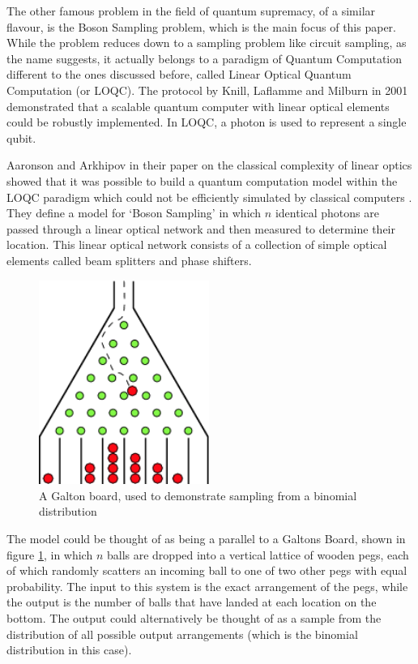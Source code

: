 \documentclass[ %
                    author={Manan Vaswani},
                supervisor={Dr. Raphael Clifford},
                    degree={MEng},
                     title={A multi-core CPU implementation \n of the classical Boson Sampling algorithm},
                  subtitle={},
                      type={},
                      year={2019} ]{dissertation}
\begin{document}
The other famous problem in the field of quantum supremacy, of a similar flavour, is the Boson Sampling problem, which is the main focus of this paper. While the problem reduces down to a sampling problem like circuit sampling, as the name suggests, it actually belongs to a paradigm of Quantum Computation different to the ones discussed before, called Linear Optical Quantum Computation (or LOQC). The protocol by Knill, Laflamme and Milburn in 2001 \cite{knill2001} demonstrated that a scalable quantum computer with linear optical elements could be robustly implemented. In LOQC, a photon is used to represent a single qubit.

Aaronson and Arkhipov in their paper on the classical complexity of linear optics showed that it was possible to build a quantum computation model within the LOQC paradigm which could not be efficiently simulated by classical computers \cite{aaronson2011}. They define a model for `Boson Sampling' in which $n$ identical photons are passed through a linear optical network and then measured to determine their location. This linear optical network consists of a collection of simple optical elements called beam splitters and phase shifters.

\begin{figure}
	\centering
  \includegraphics[width=15em]{galton_board}
  \caption{A Galton board, used to demonstrate sampling from a binomial distribution \cite{galton_board}}
  \label{fig:galton_board}
\end{figure}

The model could be thought of as being a parallel to a Galtons Board, shown in figure \ref{fig:galton_board}, in which $n$ balls are dropped into a vertical lattice of wooden pegs, each of which randomly scatters an incoming ball to one of two other pegs with equal probability. The input to this system is the exact arrangement of the pegs, while the output is the number of balls that have landed at each location on the bottom. The output could alternatively be thought of as a sample from the distribution of all possible output arrangements (which is the binomial distribution in this case).
\end{document}
